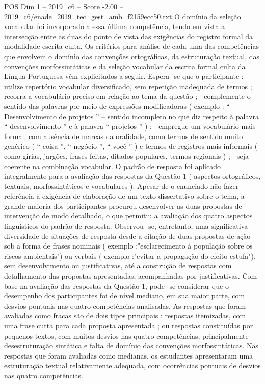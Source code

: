 \begin{textsample}{POS Dim 1 – 2019\_c6 – Score -2.00 – 2019\_c6/enade\_2019\_tec\_gest\_amb\_f2159ecc50.txt}
O domínio da seleção vocabular foi incorporado a essa última competência, tendo em vista a intersecção entre as duas do ponto de vista das exigências do registro formal da modalidade escrita culta.
Os critérios para análise de cada uma das competências que envolvem o domínio das convenções ortográficas, da estruturação textual, das convenções morfossintáticas e da seleção vocabular da escrita formal culta da Língua Portuguesa vêm explicitados a seguir.
Espera -se que o participante :  utilize repertório vocabular diversificado, sem repetição inadequada de termos ;  recorra a vocabulário preciso em relação ao tema da questão ;  complemente o sentido das palavras por meio de expressões modificadoras ( exemplo : “ Desenvolvimento de projetos ” – sentido incompleto no que diz respeito à palavra “ desenvolvimento ” e à palavra “ projetos ” ) ;  empregue um vocabulário mais formal, com ausência de marcas da oralidade, como termos de sentido muito genérico ( “ coisa ”, “ negócio ”, “ você ” ) e termos de registros mais informais ( como gírias, jargões, frases feitas, ditados populares, termos regionais ) ;  seja coerente na combinação vocabular.
O padrão de resposta foi aplicado integralmente para a avaliação das respostas da Questão 1 ( aspectos ortográficos, textuais, morfossintáticos e vocabulares ).
Apesar de o enunciado não fazer referência à exigência de elaboração de um texto dissertativo sobre o tema, a grande maioria dos participantes procurou desenvolver as duas propostas de intervenção de modo detalhado, o que permitiu a avaliação dos quatro aspectos linguísticos do padrão de resposta.
Observou -se, entretanto, uma significativa diversidade de situações de resposta desde a citação de duas propostas de ação sob a forma de frases nominais ( exemplo :"esclarecimento à população sobre os riscos ambientais") ou verbais ( exemplo :"evitar a propagação do efeito estufa"), sem desenvolvimento ou justificativas, até a construção de respostas com detalhamento das propostas apresentadas, acompanhadas por justificativas.
Com base na avaliação das respostas da Questão 1, pode -se considerar que o desempenho dos participantes foi de nível mediano, em sua maior parte, com desvios pontuais nas quatro competências analisadas.
As respostas que foram avaliadas como fracas são de dois tipos principais : respostas itemizadas, com uma frase curta para cada proposta apresentada ; ou respostas constituídas por pequenos textos, com muitos desvios nas quatro competências, principalmente desestruturação sintática e falta de domínio das convenções morfossintáticas.
Nas respostas que foram avaliadas como medianas, os estudantes apresentaram uma estruturação textual relativamente adequada, com ocorrências pontuais de desvios nas quatro competências.

\end{textsample}
